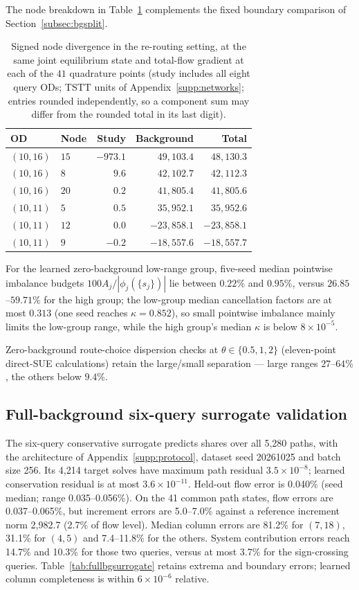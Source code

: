 The node breakdown in Table~\ref{tab:bgdecomp} complements the fixed
boundary comparison of Section~\ref{subsec:bgsplit}.
\begin{table}[pos=htbp]
\caption{Signed node divergence in the re-routing setting, at the
same joint equilibrium state and total-flow gradient at each of the
$41$ quadrature points (study includes all eight query ODs; TSTT
units of Appendix~\ref{supp:networks}; entries rounded independently,
so a component sum may differ from the rounded total in its last
digit).}
\label{tab:bgdecomp}
\small
\begin{tabular*}{\tblwidth}{@{\extracolsep{\fill}}llrrr}
\toprule
OD & Node & Study & Background & Total\\
\midrule
$(10,16)$ & $15$ & $-973.1$ & $49,103.4$ & $48,130.3$ \\
$(10,16)$ & $8$ & $9.6$ & $42,102.7$ & $42,112.3$ \\
$(10,16)$ & $20$ & $0.2$ & $41,805.4$ & $41,805.6$ \\
$(10,11)$ & $5$ & $0.5$ & $35,952.1$ & $35,952.6$ \\
$(10,11)$ & $12$ & $0.0$ & $-23,858.1$ & $-23,858.1$ \\
$(10,11)$ & $9$ & $-0.2$ & $-18,557.6$ & $-18,557.7$ \\
\bottomrule
\end{tabular*}
\end{table}

For the learned zero-background low-range group, five-seed median pointwise
imbalance budgets $100A_j/|\phi_j(\{s_j\})|$ lie between $0.22\%$ and
$0.95\%$, versus $26.85$--$59.71\%$ for the high group; the low-group
median cancellation factors are at most $0.313$ (one seed reaches
$\kappa=0.852$), so small pointwise imbalance mainly limits the
low-group range, while the high group's median $\kappa$ is below
$8\times10^{-5}$.

Zero-background route-choice dispersion checks at $\theta\in\{0.5,1,2\}$
(eleven-point direct-SUE calculations) retain the large/small
separation --- large ranges $27$--$64\%$, the others below $9.4\%$.

\subsection{Full-background six-query surrogate validation}\label{supp:fullbgsurrogate}
The six-query conservative surrogate predicts shares over all 5,280
paths, with the architecture of Appendix~\ref{supp:protocol}, dataset
seed 20261025 and batch size 256. Its 4,214 target solves have maximum
path residual $3.5\times10^{-8}$; learned conservation residual is at
most $3.6\times10^{-11}$. Held-out flow error is 0.040\% (seed median;
range 0.035--0.056\%). On the 41 common path states, flow errors are
0.037--0.065\%, but increment errors are 5.0--7.0\% against a reference
increment norm 2,982.7 (2.7\% of flow level). Median column errors are
81.2\% for $(7,18)$, 31.1\% for $(4,5)$ and 7.4--11.8\% for the
others. System contribution errors reach 14.7\% and 10.3\% for those
two queries, versus at most 3.7\% for the sign-crossing queries.
Table~\ref{tab:fullbgsurrogate} retains extrema and boundary errors;
learned column completeness is within $6\times10^{-6}$ relative.

